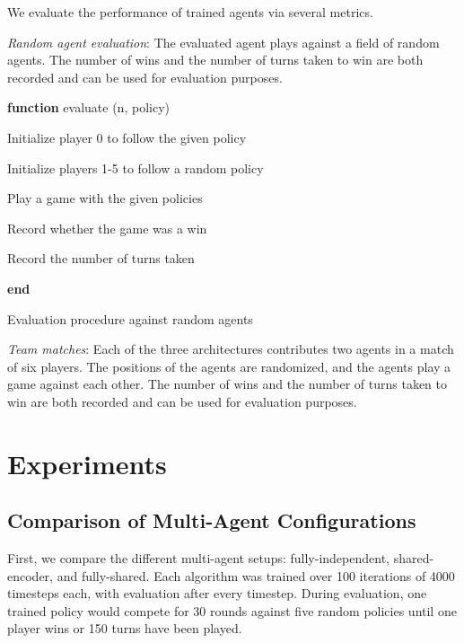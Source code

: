 \documentclass[12pt, a4paper, twocolumn]{article}
\begin{document}
We evaluate the performance of trained agents via several metrics.

\textit{Random agent evaluation}: The evaluated agent plays against a field of random agents. The number of wins and the number of turns taken to win are both recorded and can be used for evaluation purposes.

\begin{algorithm}

  \textbf{function} evaluate (n, policy)

  \Indp
  
  
  Initialize player 0 to follow the given policy
  
  Initialize players 1-5 to follow a random policy

   {
    Play a game with the given policies

    Record whether the game was a win

    Record the number of turns taken
  }

  \Indm
  \textbf{end}
  \caption{Evaluation procedure against random agents}
\end{algorithm}

\textit{Team matches}: Each of the three architectures contributes two agents in a match of six players. The positions of the agents are randomized, and the agents play a game against each other. The number of wins and the number of turns taken to win are both recorded and can be used for evaluation purposes.




\section{Experiments}

\subsection{Comparison of Multi-Agent Configurations}

First, we compare the different multi-agent setups: fully-independent, shared-encoder, and fully-shared. Each algorithm was trained over 100 iterations of 4000 timesteps each, with evaluation after every timestep. During evaluation, one trained policy would compete for 30 rounds against five random policies until one player wins or 150 turns have been played.
\end{document}
